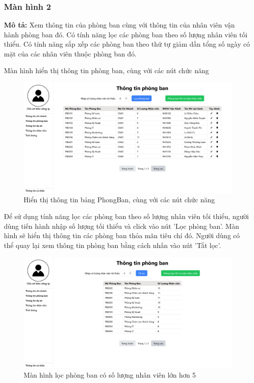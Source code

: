 \subsubsection{Màn hình 2}
\textbf{Mô tả:} Xem thông tin của phòng ban cùng với thông tin của nhân viên vận hành phòng ban đó. Có tính năng lọc các phòng ban theo số lượng nhân viên tối thiểu. Có tính năng sắp xếp các phòng ban theo thứ tự giảm dần tổng số ngày có mặt của các nhân viên thuộc phòng ban đó.

Màn hình hiển thị thông tin phòng ban, cùng với các nút chức năng
\begin{figure}[H]
    \centering
    \includegraphics[width=1\linewidth]{content/images/ManHinh_2_a.png}
    \caption{Hiển thị thông tin bảng PhongBan, cùng với các nút chức năng}
    \label{fig:ManHinh_2_a}
\end{figure}

Để sử dụng tính năng lọc các phòng ban theo số lượng nhân viên tối thiểu, người dùng tiến hành nhập số lượng tối thiểu và click vào nút 'Lọc phòng ban'. Màn hình sẽ hiển thị thông tin các phòng ban thỏa mãn tiêu chí đó. Người dùng có thể quay lại xem thông tin phòng ban bằng cách nhấn vào nút 'Tắt lọc'.
\begin{figure}[H]
    \centering
    \includegraphics[width=1\linewidth]{content/images/ManHinh_2_b.png}
    \caption{Màn hình lọc phòng ban có số lượng nhân viên lớn hơn 5}
    \label{fig:ManHinh_2_b}
\end{figure}

